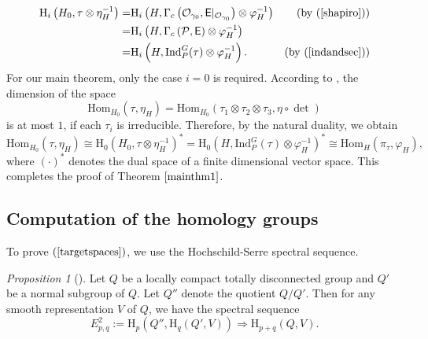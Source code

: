 \documentclass[12pt]{amsart}
\newcommand{\RH}{{\mathrm {H}}}
\newcommand{\Hom}{{\mathrm{Hom}}}
\newcommand{\Ind}{{\mathrm{Ind}}}
\theoremstyle{Theorem}
\theoremstyle{Theorem}
\theoremstyle{Theorem}
\theoremstyle{Theorem}
\theoremstyle{Plain}
\theoremstyle{remark}
\theoremstyle{remark}
\theoremstyle{Definition}
\newtheorem{prpd}[dfn]{Proposition}
\begin{document}
\[
    \begin{aligned}
        \RH_i \left( H_0, \tau \otimes \eta_H^{-1} \right) =& \RH_i
        \left(
            H, \Gamma_c \left( \mathcal{O}_{ \gamma_0 }, \mathsf{E}|_{ \mathcal{O}_{ \gamma_0 } } \right) \otimes \varphi_H^{-1} \right) & ( \text{by } ( \ref{shapiro} ) ) \\
                                                           =& \RH_i
        \left(
            H, \Gamma_c \left( \mathcal{P}, \mathsf{E} \right) \otimes \varphi_H^{-1}
        \right)                                                                        \\
                                                           =& \RH_i
        \left(
            H, \Ind^G_P ( \tau ) \otimes \varphi_H^{-1}
        \right)
        .                                            & ( \text{by } ( \ref{indandsec} ) )
    \end{aligned}
\]
For our main theorem, only the case $i = 0$ is required. According to \cite[Theorem 1.1]{Prasad}, the dimension of the space 
\[
    \Hom_{H_0} \left( \tau, \eta_H \right) = \Hom_{H_0} ( \tau_1 \otimes \tau_2 \otimes \tau_3, \eta \circ \det )
\]
is at most $1$, if each $\tau_i$ is irreducible. Therefore, by the natural duality, we obtain
\[
    \Hom_{H_0} \left( \tau, \eta_H \right) \cong \RH_0 \left( H_0, \tau \otimes \eta_H^{-1} \right)^* = \RH_0 \left( H, \Ind^G_P ( \tau ) \otimes \varphi_H^{-1} \right)^* \cong \Hom_H \left( \pi_\tau, \varphi_H \right),
\]
where $ ( \cdot )^* $ denotes the dual space of a finite dimensional vector space. This completes the proof of Theorem $ \ref{mainthm1} $.

\subsection{Computation of the homology groups}

To prove $ ( \ref{targetspaces} ) $, we use the Hochschild-Serre spectral sequence. 
\begin{prpd}[{\cite[Theorem 5]{H}}]
    Let $Q$ be a locally compact totally disconnected group and $Q'$ be a normal subgroup of $Q$. Let $Q''$ denote the quotient $Q/Q'$. Then for any smooth representation $V$ of $Q$, we have the spectral sequence
    \[
        E_{p,q}^2 := \RH_p( Q'', \RH_q( Q', V ) ) \Rightarrow \RH_{p + q}( Q, V ).
    \]
\end{prpd}
\end{document}
